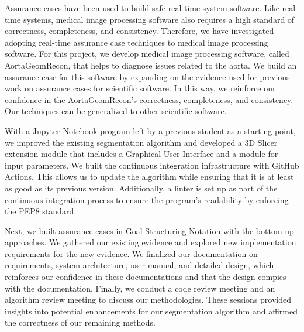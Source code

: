 
Assurance cases have been used to build safe real-time system software. Like real-time systems, medical image processing software also requires a high standard of correctness, completeness, and consistency. Therefore, we have investigated adopting real-time assurance case techniques to medical image processing software. For this project, we develop medical image processing software, called AortaGeomRecon, that helps to diagnose issues related to the aorta. We build an assurance case for this software by expanding on the evidence used for previous work on assurance cases for scientific software. In this way, we reinforce our confidence in the AortaGeomRecon's correctness, completeness, and consistency. Our techniques can be generalized to other scientific software.

With a Jupyter Notebook program left by a previous student as a starting point, we improved the existing segmentation algorithm and developed a 3D Slicer extension module that includes a Graphical User Interface and a module for input parameters. We built the continuous integration infrastructure with GitHub Actions. This allows us to update the algorithm while ensuring that it is at least as good as its previous version. Additionally, a linter is set up as part of the continuous integration process to ensure the program's readability by enforcing the PEP8 standard.

Next, we built assurance cases in Goal Structuring Notation with the bottom-up approaches. We gathered our existing evidence and explored new implementation requirements for the new evidence. We finalized our documentation on requirements, system architecture, user manual, and detailed design, which reinforces our confidence in these documentations and that the design compies with the documentation. Finally, we conduct a code review meeting and an algorithm review meeting to discuss our methodologies. These sessions provided insights into potential enhancements for our segmentation algorithm and affirmed the correctness of our remaining methods.